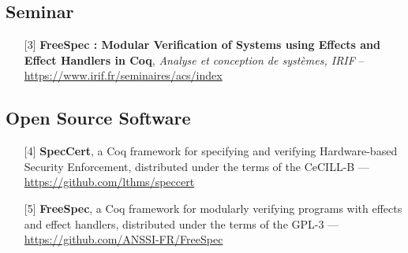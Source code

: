 \documentclass{article}
\begin{document}
\subsection{Seminar}

\begin{itemize}
\item[] [3] \textbf{FreeSpec : Modular Verification of Systems using Effects and
    Effect Handlers in Coq}, \emph{Analyse et conception de systèmes, IRIF} --
  \url{https://www.irif.fr/seminaires/acs/index}
\end{itemize}

\subsection{Open Source Software}

\begin{itemize}
\item[] [4] \textbf{SpecCert}, a Coq framework for specifying and verifying
  Hardware-based Security Enforcement, distributed under the terms of the
  CeCILL-B --- \url{https://github.com/lthms/speccert}
\item[] [5] \textbf{FreeSpec}, a Coq framework for modularly verifying programs
  with effects and effect handlers, distributed under the terms of the GPL-3 ---
  \url{https://github.com/ANSSI-FR/FreeSpec}
\end{itemize}
\end{document}
